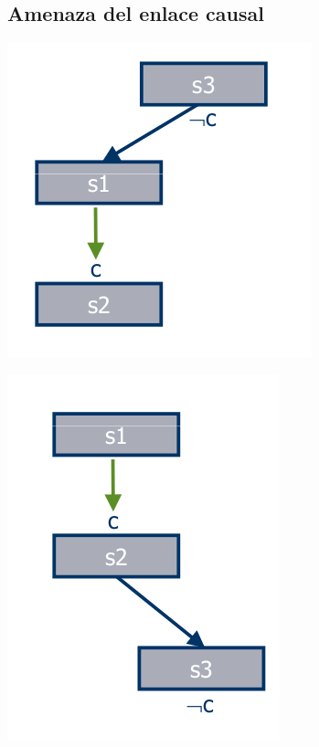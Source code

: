 \documentclass[11pt]{article}
\begin{document}
\subsection*{Amenaza del enlace causal}
\label{sec:orga9faba1}
\begin{center}
\includegraphics[width=.9\linewidth]{imagenes/arriba.png}
\end{center}

\begin{center}
\includegraphics[width=.9\linewidth]{imagenes/abajo.png}
\end{center}
\end{document}
